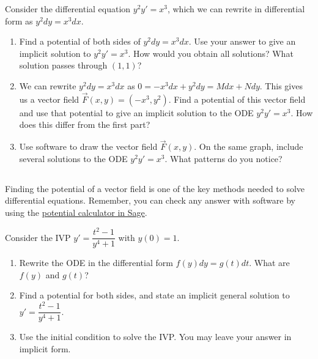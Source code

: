 \begin{problem}
 Consider the differential equation $y^2y'=x^3$, which we can rewrite in differential form as $y^2dy=x^3dx$.
\begin{enumerate}
 \item 
Find a potential of both sides of $y^2dy=x^3dx$.  Use your answer to give an implicit solution to $y^2y'=x^3$.  How would you obtain all solutions? What solution passes through $(1,1)$?
 \item 
We can rewrite $y^2dy=x^3dx$ as $0=-x^3dx+y^2dy = Mdx+Ndy$.  This gives us a vector field $\vec F(x,y)=(-x^3,y^2)$. Find a potential of this vector field and use that potential to give an implicit solution to the ODE $y^2y'=x^3$. How does this differ from the first part? 
 \item
{}%
Use software to draw the vector field $\vec F(x,y)$. On the same graph, include several solutions to the ODE $y^2y'=x^3$.  What patterns do you notice?
\end{enumerate}
\end{problem}


\subsection*{\ideaC}

Finding the potential of a vector field is one of the key methods needed to solve differential equations. Remember, you can check any answer with software by using the \href{\urlpotentialcalculator}{potential calculator in Sage}.

\begin{problem}
Consider the IVP $y'=\dfrac{t^2-1}{y^4+1}$ with $y(0)=1$.  
\begin{enumerate}
 \item Rewrite the ODE in the differential form $f(y)dy=g(t)dt$.  What are $f(y)$ and $g(t)$?
 \item Find a potential for both sides, and state an implicit general solution to $y'=\dfrac{t^2-1}{y^4+1}$.
 \item Use the initial condition to solve the IVP. You may leave your answer in implicit form.  
\end{enumerate}
\end{problem}

